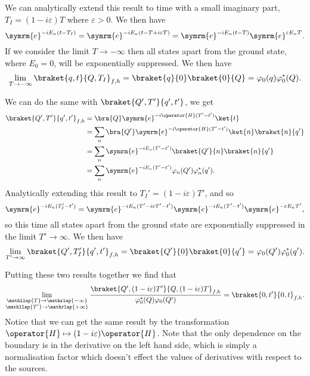\documentclass[fleqn]{NotesClass}
\newcommand{\e}{\symrm{e}}
\begin{document}
    We can analytically extend this result to time with a small imaginary part, \(T_I = (1 - i\varepsilon)T\) where \(\varepsilon > 0\).
    We then have
    \begin{equation}
        \e^{-iE_n(t - T_I)} = \e^{-iE_n(t - T + i\varepsilon T)} = \e^{-iE_n(t - T)} \e^{\varepsilon E_nT}.
    \end{equation}
    If we consider the limit \(T \to -\infty\) then all states apart from the ground state, where \(E_0 = 0\), will be exponentially suppressed.
    We then have
    \begin{equation}
        \lim_{T \to -\infty} \braket{q, t}{Q, T_I}_{f,h} = \braket{q}{0}\braket{0}{Q} = \varphi_0(q)\varphi_0^*(Q).
    \end{equation}
    
    We can do the same with \(\braket{Q',T'}{q',t'}\), we get
    \begin{align}
        \braket{Q',T'}{q',t'}_{f,h} &= \bra{Q} \e^{-i\operator{H}(T' - t')} \ket{t}\\
        &= \sum_n \bra{Q'} \e^{-i\operator{H}(T' - t')} \ket{n} \braket{n}{q'}\\
        &= \sum_n \e^{-iE_n(T' - t')} \braket{Q'}{n}\braket{n}{q'}\\
        &= \sum_n \e^{-iE_n(T' - t')} \varphi_n(Q')\varphi_n^*(q').
    \end{align}
    Analytically extending this result to \(T_I' = (1 - i\varepsilon)T'\), and so
    \begin{equation}
        \e^{-iE_n(T_I' - t')} = \e^{-iE_n(T' - i\varepsilon T' - t')} \e^{-iE_n(T' - t')}\e^{-\varepsilon E_nT'},
    \end{equation}
    so this time all states apart from the ground state are exponentially suppressed in the limit \(T' \to \infty\).
    We then have
    \begin{equation}
        \lim_{T' \to \infty} \braket{Q', T'_I}{q', t'}_{f,h}  = \braket{Q'}{0} \braket{0}{q'} = \varphi_0(Q') \varphi_0^*(q').
    \end{equation}
    
    Putting these two results together we find that
    \begin{equation}
        \lim_{\substack{\mathllap{T} \to \mathrlap{-\infty}\\ \mathllap{T'} \to \mathrlap{+\infty}}} \frac{\braket{Q', (1 - i\varepsilon)T'}{Q, (1 - i\varepsilon)T}_{f,h}}{\varphi_0^*(Q) \varphi_0(Q')} = \braket{0, t'}{0, t}_{f,h}.
    \end{equation}
    Notice that we can get the same result by the transformation \(\operator{H} \mapsto (1 - i\varepsilon)\operator{H}\).
    Note that the only dependence on the boundary is in the derivative on the left hand side, which is simply a normalisation factor which doesn't effect the values of derivatives with respect to the sources.
    
\end{document}

